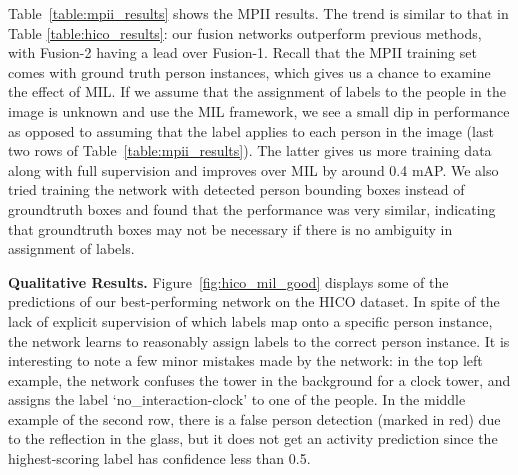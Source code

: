 \documentclass[runningheads]{llncs}
\begin{document}
Table~\ref{table:mpii_results} shows the MPII results. The trend is similar to that in Table \ref{table:hico_results}: our fusion networks outperform previous methods, with Fusion-2 having a lead over Fusion-1. Recall that the MPII training set comes with ground truth person instances, which gives us a chance to examine the effect of MIL. If we assume that the assignment of labels to the people in the image is unknown and use the MIL framework, we see a small dip in performance as opposed to assuming that the label applies to each person in the image (last two rows of Table~\ref{table:mpii_results}). The latter gives us more training data along with full supervision and improves over MIL by around 0.4 mAP. We also tried training the network with detected person bounding boxes instead of groundtruth boxes and found that the performance was very similar, indicating that groundtruth boxes may not be necessary if there is no ambiguity in assignment of labels.

{\bf Qualitative Results.}
Figure~\ref{fig:hico_mil_good} displays some of the predictions of our best-performing network on the HICO dataset. In spite of the lack of explicit supervision of which labels map onto a specific person instance, the network learns to reasonably assign labels to the correct person instance. It is interesting to note a few minor mistakes made by the network: in the top left example, the network confuses the tower in the background for a clock tower, and assigns the label `no\_interaction-clock' to one of the people. In the middle example of the second row, there is a false person detection (marked in red) due to the reflection in the glass, but it does not get an activity prediction since the highest-scoring label has confidence less than 0.5. 
\end{document}
